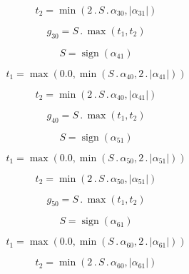 \documentclass{article}
\begin{document}
\begin{dmath}t_{2} = \min\left(2 \,.\, S \,.\, \alpha_{30}, \left|{\alpha_{31}}\right|\right)\end{dmath}

\begin{dmath}g_{30} = S \,.\, \max\left(t_{1}, t_{2}\right)\end{dmath}

\begin{dmath}S = \operatorname{sign}{\left (\alpha_{41} \right )}\end{dmath}

\begin{dmath}t_{1} = \max\left(0.0, \min\left(S \,.\, \alpha_{40}, 2 \,.\, \left|{\alpha_{41}}\right|\right)\right)\end{dmath}

\begin{dmath}t_{2} = \min\left(2 \,.\, S \,.\, \alpha_{40}, \left|{\alpha_{41}}\right|\right)\end{dmath}

\begin{dmath}g_{40} = S \,.\, \max\left(t_{1}, t_{2}\right)\end{dmath}

\begin{dmath}S = \operatorname{sign}{\left (\alpha_{51} \right )}\end{dmath}

\begin{dmath}t_{1} = \max\left(0.0, \min\left(S \,.\, \alpha_{50}, 2 \,.\, \left|{\alpha_{51}}\right|\right)\right)\end{dmath}

\begin{dmath}t_{2} = \min\left(2 \,.\, S \,.\, \alpha_{50}, \left|{\alpha_{51}}\right|\right)\end{dmath}

\begin{dmath}g_{50} = S \,.\, \max\left(t_{1}, t_{2}\right)\end{dmath}

\begin{dmath}S = \operatorname{sign}{\left (\alpha_{61} \right )}\end{dmath}

\begin{dmath}t_{1} = \max\left(0.0, \min\left(S \,.\, \alpha_{60}, 2 \,.\, \left|{\alpha_{61}}\right|\right)\right)\end{dmath}

\begin{dmath}t_{2} = \min\left(2 \,.\, S \,.\, \alpha_{60}, \left|{\alpha_{61}}\right|\right)\end{dmath}
\end{document}
